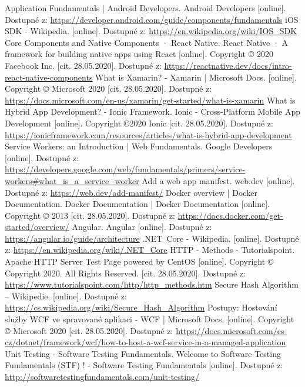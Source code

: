 \documentclass[
  glossaries,
]{kidiplom}
\begin{document}
\begin{thebibliography}{9}
Application Fundamentals | Android Developers. Android Developers [online]. Dostupné z: \url{https://developer.android.com/guide/components/fundamentals}
iOS SDK - Wikipedia. [online]. Dostupné z: \url{https://en.wikipedia.org/wiki/IOS\_SDK}
    Core Components and Native Components · React Native. React Native · A framework for building native apps using React [online]. Copyright © 2020 Facebook Inc. [cit. 28.05.2020]. Dostupné z: \url{https://reactnative.dev/docs/intro-react-native-components}
     What is Xamarin? - Xamarin | Microsoft Docs. [online]. Copyright © Microsoft 2020 [cit. 28.05.2020]. Dostupné z: \url{https://docs.microsoft.com/en-us/xamarin/get-started/what-is-xamarin}
     What is Hybrid App Development? - Ionic Framework. Ionic - Cross-Platform Mobile App Development [online]. Copyright ©2020 Ionic [cit. 28.05.2020]. Dostupné z: \url{https://ionicframework.com/resources/articles/what-is-hybrid-app-development}
     Service Workers: an Introduction  |  Web Fundamentals. Google Developers [online]. Dostupné z: \url{https://developers.google.com/web/fundamentals/primers/service-workers\#what\_is\_a\_service\_worker}
     Add a web app manifest. web.dev [online]. Dostupné z: \url{https://web.dev/add-manifest/}
     Docker overview | Docker Documentation. Docker Documentation | Docker Documentation [online]. Copyright © 2013 [cit. 28.05.2020]. Dostupné z:  \url{https://docs.docker.com/get-started/overview/}
     Angular. Angular [online]. Dostupné z:  \url{https://angular.io/guide/architecture}
     .NET\ Core - Wikipedia. [online]. Dostupné z: \url{https://en.wikipedia.org/wiki/.NET\_Core}
     HTTP - Methods - Tutorialspoint. Apache HTTP Server Test Page powered by CentOS [online]. Copyright © Copyright 2020. All Rights Reserved. [cit. 28.05.2020]. Dostupné z: \url{https://www.tutorialspoint.com/http/http\_methods.htm}
     Secure Hash Algorithm – Wikipedie. [online]. Dostupné z: \url{https://cs.wikipedia.org/wiki/Secure\_Hash\_Algorithm}
     Postupy: Hostování služby WCF ve spravované aplikaci - WCF | Microsoft Docs. [online]. Copyright © Microsoft 2020 [cit. 28.05.2020]. Dostupné z: \url{https://docs.microsoft.com/cs-cz/dotnet/framework/wcf/how-to-host-a-wcf-service-in-a-managed-application}
     Unit Testing - Software Testing Fundamentals. Welcome to Software Testing Fundamentals (STF) ! - Software Testing Fundamentals [online]. Dostupné z: \url{http://softwaretestingfundamentals.com/unit-testing/}

\end{thebibliography}
\end{document}
